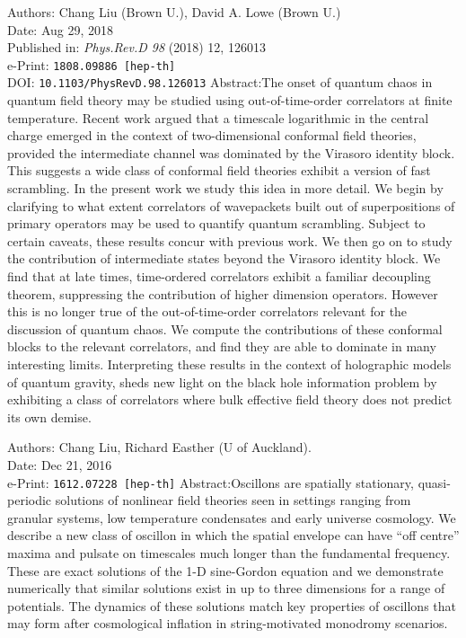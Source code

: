 \documentclass{brownthesis}
\begin{document}
\medbreak
\noindent Authors: Chang Liu (Brown U.), David A. Lowe (Brown U.)\\
Date: Aug 29, 2018\\
Published in: {\sl Phys.Rev.D 98} (2018) 12, 126013\\
e-Print: {\tt 1808.09886 [hep-th]}\\
DOI: {\tt 10.1103/PhysRevD.98.126013}
\medbreak
\noindent Abstract:\quad The onset of quantum chaos in quantum field theory may be studied using out-of-time-order correlators at finite temperature. Recent work argued that a timescale logarithmic in the central charge emerged in the context of two-dimensional conformal field theories, provided the intermediate channel was dominated by the Virasoro identity block. This suggests a wide class of conformal field theories exhibit a version of fast scrambling. In the present work we study this idea in more detail. We begin by clarifying to what extent correlators of wavepackets built out of superpositions of primary operators may be used to quantify quantum scrambling. Subject to certain caveats, these results concur with previous work. We then go on to study the contribution of intermediate states beyond the Virasoro identity block. We find that at late times, time-ordered correlators exhibit a familiar decoupling theorem, suppressing the contribution of higher dimension operators. However this is no longer true of the out-of-time-order correlators relevant for the discussion of quantum chaos. We compute the contributions of these conformal blocks to the relevant correlators, and find they are able to dominate in many interesting limits. Interpreting these results in the context of holographic models of quantum gravity, sheds new light on the black hole information problem by exhibiting a class of correlators where bulk effective field theory does not predict its own demise.

\bigbreak
{}
\medbreak
\noindent Authors: Chang Liu, Richard Easther (U of Auckland).\\
Date: Dec 21, 2016\\
e-Print: {\tt 1612.07228 [hep-th]}
\medbreak
\noindent Abstract:\quad Oscillons are spatially stationary, quasi-periodic solutions of nonlinear field theories seen in settings ranging from granular systems, low temperature condensates and early universe cosmology. We describe a new class of oscillon in which the spatial envelope can have ``off centre'' maxima and pulsate on timescales much longer than the fundamental frequency. These are exact solutions of the 1-D sine-Gordon equation and we demonstrate numerically that similar solutions exist in up to three dimensions for a range of potentials. The dynamics of these solutions match key properties of oscillons that may form after cosmological inflation in string-motivated monodromy scenarios.
\end{document}

